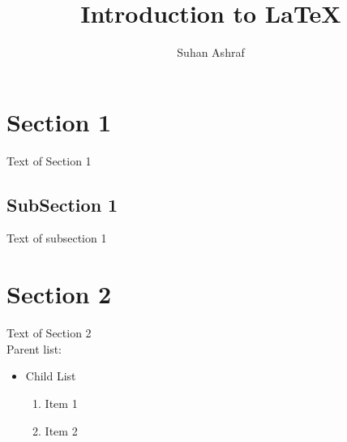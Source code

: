 \documentclass{article}
\begin{document}
	\title{Introduction to \LaTeX{}}
	\author{Suhan Ashraf}

	\maketitle

	\tableofcontents

	\section{Section 1}
	{\selectfont \Large Text of Section 1}
	\subsection{SubSection 1}
	Text of subsection 1
	\section{Section 2}
	{\selectfont \Huge Text of Section 2}
	\\Parent list:
	\begin{itemize}
		\item Child List
		\begin{enumerate}
			\item Item 1
			\item Item 2
		\end{enumerate}
	\end{itemize}
\end{document}
